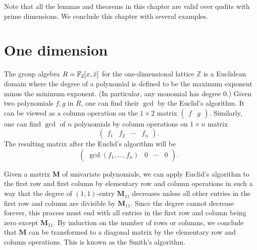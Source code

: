 Note that all the lemmas and theorems in this chapter are valid over qudits with prime dimensions.
We conclude this chapter with several examples.

\section{One dimension}

The group algebra $R = \mathbb{F}_2[x,\bar x]$ for the one-dimensional lattice $\mathbb{Z}$
is a Euclidean domain
where the degree of a polynomial is defined to be the maximum exponent minus the minimum exponent.
(In particular, any monomial has degree $0$.)
Given two polynomials $f,g$ in $R$, one can find their $\gcd$ by the Euclid's algorithm.
It can be viewed as a column operation on the $1 \times 2$ matrix $\begin{pmatrix} f & g \end{pmatrix}$.
Similarly, one can find $\gcd$ of $n$ polynomials by column operations on $1 \times n$ matrix
\[
 \begin{pmatrix}
  f_1 & f_2 & \cdots & f_n
 \end{pmatrix} .
\]
The resulting matrix after the Euclid's algorithm will be
\[
\begin{pmatrix}
\gcd(f_1,\ldots,f_n) & 0 & \cdots & 0
\end{pmatrix} .
\]

Given a matrix $\mathbf M$ of univariate polynomials, we can apply Euclid's algorithm
to the first row and first column by elementary row and column operations
in such a way that the degree of $(1,1)$-entry $\mathbf M_{11}$ decreases unless all other
entries in the first row and column are divisible by $\mathbf M_{11}$.
Since the degree cannot decrease forever, this process must end
with all entries in the first row and column being zero except $\mathbf M_{11}$.
By induction on the number of rows or columns,
we conclude that $\mathbf M$ can be transformed to a diagonal matrix
by the elementary row and column operations.
This is known as the Smith's algorithm.


